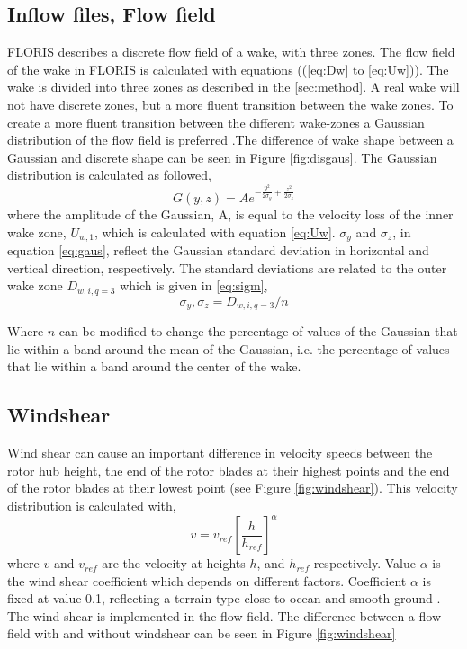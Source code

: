 \subsection{Inflow files, Flow field} FLORIS describes a discrete flow field of a wake, with three zones. The flow field of the wake in FLORIS is calculated with equations ((\ref{eq:Dw} to \ref{eq:Uw})). The wake is divided into three zones as described in the \ref{sec:method}. A real wake will not have discrete zones, but a more fluent transition between the wake zones. To create a more fluent transition between the different wake-zones a Gaussian distribution of the flow field is preferred \cite{Bastankhah2016}.The difference of wake shape between a Gaussian and discrete shape can be seen in Figure \ref{fig:disgaus}.  The Gaussian distribution is calculated as followed, 
\begin{equation}
\label{eq:gaus}
G(y, z) = A e^{-\frac{y^2}{2\sigma_y} + \frac{z^2}{2\sigma_z}}
\end{equation}
where the amplitude of the Gaussian, A, is equal to the velocity loss of the inner wake zone, $U_{w,1}$, which is calculated with equation \ref{eq:Uw}. $\sigma_y$ and $\sigma_z$, in equation \ref{eq:gaus}, reflect the Gaussian standard deviation in horizontal and vertical direction, respectively. The standard deviations are related to the outer wake zone $D_{w,i,q=3}$ which is given in \ref{eq:sigm},
\begin{equation}
\label{eq:sigm}
\sigma_y,\sigma_z = D_{w,i,q=3}/n 
\end{equation}


Where $n$ can be modified to change the percentage of values of the Gaussian that lie within a band around the mean of the Gaussian, i.e. the percentage of values that lie within a band around the center of the wake.

\subsection{Windshear}
Wind shear can cause an important difference in velocity speeds between the rotor hub height, the end of the rotor blades at their highest points and the end of the rotor blades at their lowest point \cite{Firtin2011} (see Figure \ref{fig:windshear}). This velocity distribution is calculated with, 
\begin{equation}
\label{eq:shear}
v = v_{ref} \left[\frac{h}{h_{ref}}\right]^\alpha
\end{equation}
where $v$ and $v_{ref}$ are the velocity at heights $h$, and $h_{ref}$  respectively. Value $\alpha$ is the wind shear coefficient which depends on different factors. Coefficient $\alpha$ is fixed at value 0.1, reflecting a terrain type close to ocean and smooth ground \cite{Firtin2011}. The wind shear is implemented in the flow field. The difference between a flow field with and without windshear can be seen in Figure \ref{fig:windshear}

